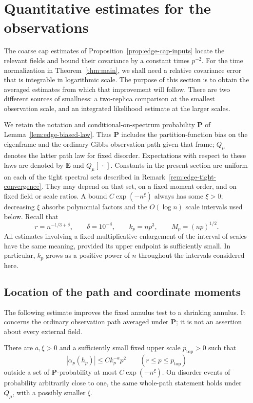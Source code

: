 \section{Quantitative estimates for the observations}\label{sec:observations}

The coarse cap estimates of Proposition~\ref{prop:edge-cap-inputs} locate
the relevant fields and bound their covariance by a constant times $p^{-2}$.
For the time normalization in Theorem~\ref{thm:main}, we shall need a relative
covariance error that is integrable in logarithmic scale. The purpose of
this section is to obtain the averaged estimates from which that improvement
will follow. There are two different sources of smallness: a two-replica
comparison at the smallest observation scale, and an integrated likelihood
estimate at the larger scales.

We retain the notation and conditional-on-spectrum probability
$\mathbf P$ of Lemma~\ref{lem:edge-biased-law}. Thus $\mathbf P$ includes the
partition-function bias on the eigenframe and the ordinary Gibbs observation
path given that frame; $Q_\mu$ denotes the latter path law for fixed disorder.
Expectations with respect to these laws are denoted by $\mathbf E$ and
$Q_\mu[\,\cdot\,]$. Constants in the present section are uniform on each of
the tight spectral sets described in Remark~\ref{rem:edge-tight-convergence}.
They may depend on that set, on a fixed moment order, and on fixed field or
scale ratios. A bound $C\exp(-n^\xi)$ always has some $\xi>0$; decreasing
$\xi$ absorbs polynomial factors and the $O(\log n)$ scale intervals used
below. Recall that
\[
 r=n^{-1/3+\delta},\qquad \delta=10^{-4},\qquad k_p=np^3,
 \qquad M_p=(np)^{1/2}.
\]
All estimates involving a fixed multiplicative enlargement of the interval
of scales have the same meaning, provided its upper endpoint is sufficiently
small. In particular, $k_p$ grows as a positive power of $n$ throughout the
intervals considered here.

\subsection{Location of the path and coordinate moments}

The following estimate improves the fixed annulus test to a shrinking
annulus. It concerns the ordinary observation path averaged under
$\mathbf P$; it is not an assertion about every external field.

\begin{lemma}\label{lem:observations-annulus}
There are $a,\xi>0$ and a sufficiently small fixed upper scale
$p_{\mathrm{top}}>0$ such that
\begin{equation}\label{eq:source-7}
 |\alpha_p(h_p)|\le C k_p^{-a}p^2
 \qquad(r\le p\le p_{\mathrm{top}})
\end{equation}
outside a set of $\mathbf P$-probability at most $C\exp(-n^\xi)$.
On disorder events of probability arbitrarily close to one, the same
whole-path statement holds under $Q_\mu$, with a possibly smaller $\xi$.
\end{lemma}

